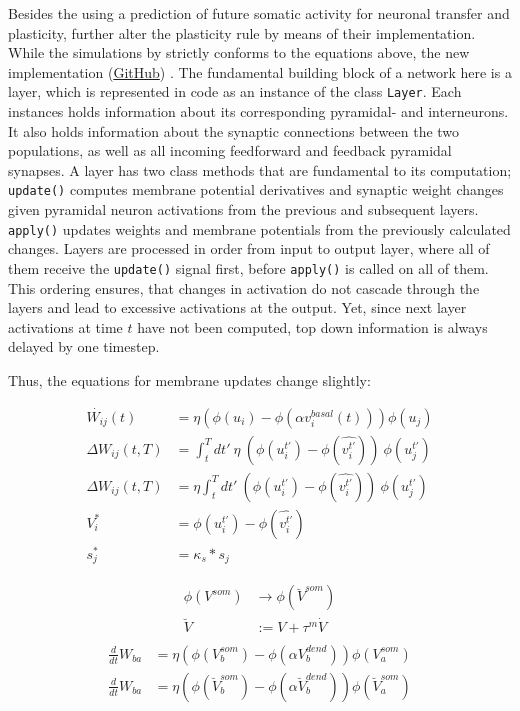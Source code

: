 Besides the using a prediction of future somatic activity for neuronal transfer and plasticity, \cite{Haider2021}
further alter the plasticity rule by means of their implementation. While the simulations by
\cite{sacramento2018dendritic} strictly conforms to the equations above, the new implementation
(\href{https://github.com/neurips}{GitHub}) . The fundamental building block of a network here is a layer, which is
represented in code as an instance of the class \texttt{Layer}. Each instances holds information about its corresponding
pyramidal- and interneurons. It also holds information about the synaptic connections between the two populations, as
well as all incoming feedforward and feedback pyramidal synapses. A layer has two class methods that are fundamental to
its computation; \texttt{update()} computes membrane potential derivatives and synaptic weight changes given pyramidal
neuron activations from the previous and subsequent layers. \texttt{apply()} updates weights and membrane potentials
from the previously calculated changes. Layers are processed in order from input to output layer, where all of them
receive the \texttt{update()} signal first, before \texttt{apply()} is called on all of them. This ordering ensures,
that changes in activation do not cascade through the layers and lead to excessive activations at the output. Yet, since
next layer activations at time $t$ have not been computed, top down information is always delayed by one timestep.


Thus, the equations for membrane updates change slightly:

\begin{align}
  \dot{W_{ij}}(t)    & = \eta (\phi(u_i) - \phi(\alpha v^{basal}_i(t))) \phi(u_j)                             \\
  \Delta W_{ij}(t,T) & = \int_t^T dt' \ \eta \  (\phi(u_i^{t'}) - \phi(\widehat{v_i^{t'}})) \  \phi(u_j^{t'}) \\
  \Delta W_{ij}(t,T) & = \eta \int_t^T dt' \  (\phi(u_i^{t'}) - \phi(\widehat{v_i^{t'}})) \ \phi(u_j^{t'})    \\
  V_i^*              & = \phi(u_i^{t'}) - \phi(\widehat{v_i^{t'}})                                            \\
  s_j^*              & = \kappa_s * s_j
\end{align}



\begin{align}
  \phi(V^{som}) & \rightarrow \phi(\breve{V}^{som}) \\
  \breve{V}     & := V + \tau^m \dot{V}             \\
\end{align}
\begin{align}
  \frac{d}{dt} W_{ba} & = \eta (\phi(V_b^{som}) - \phi(\alpha V_b^{dend})) \phi(V_a^{som})                         \\
  \frac{d}{dt} W_{ba} & = \eta (\phi(\breve{V}_b^{som}) - \phi(\alpha \breve{V}_b^{dend})) \phi(\breve{V}_a^{som})
\end{align}


